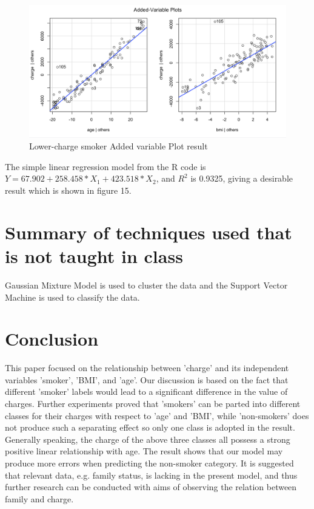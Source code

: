 \documentclass[12pt,a4paper]{article}
\begin{document}
\begin{figure}[H]
\centering
\includegraphics[width=1\textwidth]{avplot.png}
\caption{Lower-charge smoker Added variable Plot result}
\end{figure}

The simple linear regression model from the R code is $Y =  67.902 + 258.458 * X_1 +  423.518 * X_2$, and $R^{2}$ is 0.9325, giving a desirable result which is shown in figure 15.

\section{Summary of techniques used that is not taught in class}

Gaussian Mixture Model is used to cluster the data and the Support Vector Machine is used to classify the data.
\section{Conclusion}
This paper focused on the relationship between 'charge' and its independent variables 'smoker', 'BMI', and 'age'. Our discussion is based on the fact that different 'smoker' labels would lead to a significant difference in the value of charges. Further experiments proved that 'smokers' can be parted into different classes for their charges with respect to 'age' and 'BMI', while 'non-smokers' does not produce such a separating effect so only one class is adopted in the result. Generally speaking, the charge of the above three classes all possess a strong positive linear relationship with age. 
The result shows that our model may produce more errors when predicting the non-smoker category. It is suggested that relevant data, e.g. family status, is lacking in the present model, and thus further research can be conducted with aims of observing the relation between family and charge.
\end{document}
